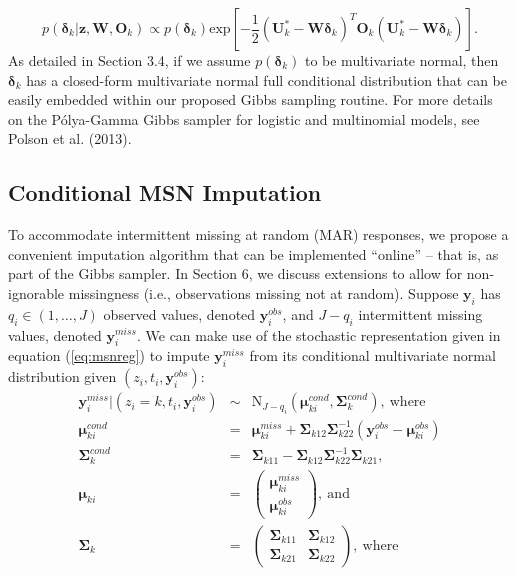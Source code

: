 \documentclass[useAMS,referee]{biom}
\begin{document}
\begin{equation}
	p(\boldsymbol\delta_k|\mathbf{z},\mathbf{W}, \mathbf{O}_k) \propto p(\boldsymbol\delta_k) \text{exp} \left [ - \frac{1}{2} (\mathbf{U}^*_k - \mathbf{W}\boldsymbol\delta_k)^T \mathbf{O}_k (\mathbf{U}^*_k - \mathbf{W}\boldsymbol\delta_k)\right].
\end{equation}
As detailed in Section 3.4, if we assume $p(\boldsymbol\delta_k)$ to be multivariate normal, then $\boldsymbol\delta_k$ has a closed-form multivariate normal full conditional distribution that can be easily embedded within our proposed Gibbs sampling routine.  For more details on the P\'olya-Gamma Gibbs sampler for logistic and multinomial models, see Polson et al. (2013).
\subsection{Conditional MSN Imputation}
To accommodate intermittent missing at random (MAR) responses, we propose a convenient imputation algorithm that can be implemented ``online'' -- that is, as part of the Gibbs sampler. In Section 6, we discuss extensions to allow for non-ignorable missingness (i.e., observations missing not at random). Suppose $\mathbf{y}_i$ has $q_i\in (1,\ldots,J)$ observed values, denoted $\mathbf{y}^{obs}_i$, and $J-q_i$ intermittent missing values, denoted $\mathbf{y}^{miss}_i$. We can make use of the stochastic representation given in equation (\ref{eq:msnreg}) to impute $\mathbf{y}^{miss}_i$ from its conditional multivariate normal distribution given $(z_i,t_i,\mathbf{y}^{obs}_i)$:
\begin{eqnarray}
\mathbf{y}^{miss}_i|(z_i=k,t_i,\mathbf{y}^{obs}_i)&\sim& \text{N}_{J-q_i}(\boldsymbol\mu^{cond}_{ki},\boldsymbol\Sigma^{cond}_k),~\text{where}\nonumber\\
\boldsymbol\mu^{cond}_{ki}&=& \boldsymbol\mu^{miss}_{ki} + \boldsymbol\Sigma_{k12} \boldsymbol\Sigma_{k22}^{-1}(\mathbf{y}^{obs}_i - \boldsymbol\mu^{obs}_{ki}) \nonumber \\
\boldsymbol\Sigma^{cond}_k&=& \boldsymbol\Sigma_{k11} - \boldsymbol\Sigma_{k12}\boldsymbol\Sigma_{k22}^{-1}\boldsymbol\Sigma_{k21}, \label{eq:impute} \\
\boldsymbol\mu_{ki} &=& \begin{pmatrix} \boldsymbol\mu_{ki}^{miss} \\ \boldsymbol\mu_{ki}^{obs} \end{pmatrix}, \ \text{and} \nonumber \\
\boldsymbol\Sigma_k &=& \begin{pmatrix} 
	\boldsymbol\Sigma_{k11} & \boldsymbol\Sigma_{k12}\\
	\boldsymbol\Sigma_{k21} & \boldsymbol\Sigma_{k22}
\end{pmatrix}, \ \text{where} \nonumber
\end{eqnarray}
\end{document}
